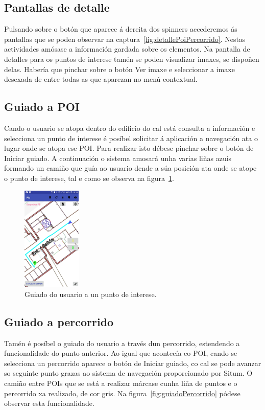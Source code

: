 \subsection{Pantallas de detalle}
Pulsando sobre o botón que aparece á dereita dos spinners accederemos ás pantallas que se poden observar na captura~\ref{fig:detallePoiPercorrido}. Nestas actividades amósase a información gardada sobre os elementos. Na pantalla de detalles para os puntos de interese tamén se poden visualizar imaxes, se dispoñen delas. Habería que pinchar sobre o botón Ver imaxe e seleccionar a imaxe desexada de entre todas as que aparezan no menú contextual.

\subsection{Guiado a POI}
Cando o usuario se atopa dentro do edificio do cal está consulta a información e selecciona un punto de interese é posíbel solicitar á aplicación a navegación ata o lugar onde se atopa ese POI. Para realizar isto débese pinchar sobre o botón de Iniciar guiado. A continuación o sistema amosará unha varias liñas azuis formando un camiño que guía ao usuario dende a súa posición ata onde se atope o punto de interese, tal e como se observa na figura~\ref{fig:guiadoPOI}.

\begin{figure}[H]
	\begin{center}
		\includegraphics[width=0.25\textwidth]{figures/android/guiadoPOI}
		\caption{Guiado do usuario a un punto de interese.}
		\label{fig:guiadoPOI}
	\end{center}
\end{figure}

\subsection{Guiado a percorrido}
Tamén é posíbel o guiado do usuario a través dun percorrido, estendendo a funcionalidade do punto anterior. Ao igual que acontecía co POI, cando se selecciona un percorrido aparece o botón de Iniciar guiado, co cal se pode avanzar so seguinte punto grazas ao sistema de navegación proporcionado por Situm. O camiño entre POIs que se está a realizar márcase cunha liña de puntos e o percorrido xa realizado, de cor gris. Na figura~\ref{fig:guiadoPercorrido} pódese observar esta funcionalidade.

